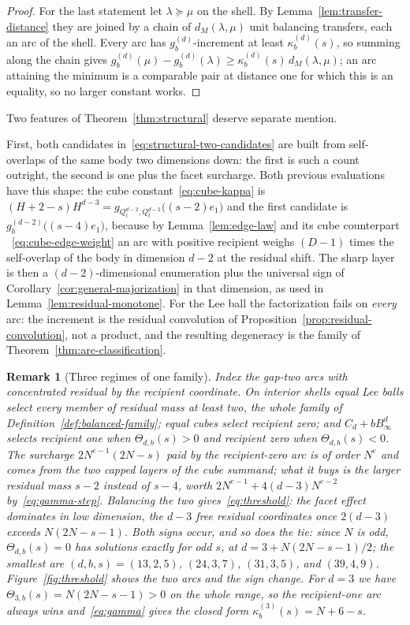 \documentclass[pdflatex,sn-mathphys-num]{sn-jnl}
\theoremstyle{thmstyleone}
\theoremstyle{thmstylethree}
\theoremstyle{thmstyletwo}
\newtheorem*{namedremark}{Remark}
\begin{document}
\begin{proof}
For the last statement let $\lambda\succeq\mu$ on the shell.  By
Lemma~\ref{lem:transfer-distance} they are joined by a chain of
$d_M(\lambda,\mu)$ unit balancing transfers, each an arc of the shell.  Every
arc has $g_b^{(d)}$-increment at least $\kappa_b^{(d)}(s)$, so summing along
the chain gives
$g_b^{(d)}(\mu)-g_b^{(d)}(\lambda)\ge\kappa_b^{(d)}(s)\,d_M(\lambda,\mu)$; an
arc attaining the minimum is a comparable pair at distance one for which this
is an equality, so no larger constant works.
\end{proof}

Two features of Theorem~\ref{thm:structural} deserve separate mention.

First, both candidates in~\eqref{eq:structural-two-candidates} are built from
self-overlaps of the same body two dimensions down: the first is such a count
outright, the second is one plus the facet surcharge.  Both previous
evaluations have this shape: the cube constant~\eqref{eq:cube-kappa} is
$(H+2-s)H^{d-3}=g_{Q_t^{d-2},Q_t^{d-2}}\bigl((s-2)e_1\bigr)$ and the first
candidate is $g_b^{(d-2)}\bigl((s-4)e_1\bigr)$, because by
Lemma~\ref{lem:edge-law} and its cube counterpart
~\eqref{eq:cube-edge-weight} an arc with positive recipient weighs $(D-1)$
times the self-overlap of the body in dimension $d-2$ at the residual shift.
The sharp layer is then a $(d-2)$-dimensional enumeration plus the universal
sign of Corollary~\ref{cor:general-majorization} in that dimension, as used in
Lemma~\ref{lem:residual-monotone}.  For the Lee ball the factorization fails
on \emph{every} arc: the increment is the residual convolution of
Proposition~\ref{prop:residual-convolution}, not a product, and the resulting
degeneracy is the family of Theorem~\ref{thm:arc-classification}.

\begin{namedremark}[Three regimes of one family]
Index the gap-two arcs with concentrated residual by the recipient coordinate.
On interior shells equal Lee balls select every member of residual mass at
least two, the whole family of Definition~\ref{def:balanced-family}; equal
cubes select recipient zero; and $C_d+bB_\infty^d$ selects recipient one when
$\Theta_{d,b}(s)>0$ and recipient zero when $\Theta_{d,b}(s)<0$.  The
surcharge $2N^{e-1}(2N-s)$ paid by the recipient-zero arc is of order $N^e$
and comes from the two capped layers of the cube summand; what it buys is the
larger residual mass $s-2$ instead of $s-4$, worth
$2N^{e-1}+4(d-3)N^{e-2}$ by~\eqref{eq:gamma-step}.  Balancing the two
gives~\eqref{eq:threshold}: the facet effect dominates in low dimension, the
$d-3$ free residual coordinates once $2(d-3)$ exceeds $N(2N-s-1)$.  Both signs
occur, and so does the tie: since $N$ is odd, $\Theta_{d,b}(s)=0$ has
solutions exactly for odd $s$, at $d=3+N(2N-s-1)/2$; the smallest are
$(d,b,s)=(13,2,5)$, $(24,3,7)$, $(31,3,5)$, and $(39,4,9)$.
Figure~\ref{fig:threshold} shows the two arcs and the sign change.  For $d=3$
we have $\Theta_{3,b}(s)=N(2N-s-1)>0$ on the whole range, so the
recipient-one arc always wins and~\eqref{eq:gamma} gives the closed form
$\kappa_b^{(3)}(s)=N+6-s$.
\end{namedremark}
\end{document}
